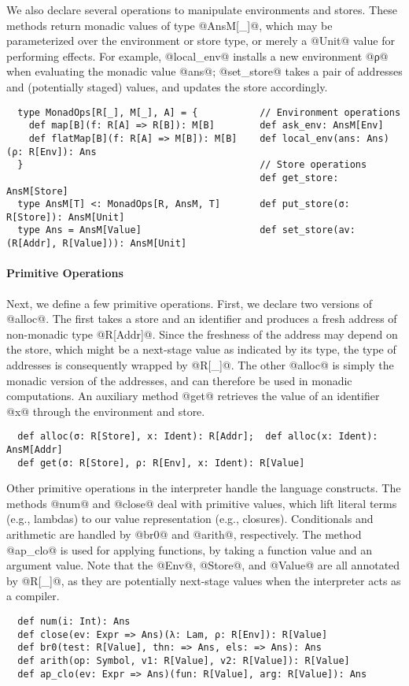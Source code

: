 We also declare several operations to manipulate environments and
stores. These methods return monadic values of type @AnsM[_]@, which
may be parameterized over the environment or store type, or merely a @Unit@
value for performing effects. For example, @local_env@ installs a new environment
@ρ@ when evaluating the monadic value @ans@; @set_store@ takes a pair of
addresses and (potentially staged) values, and updates the store accordingly.
\begin{lstlisting}
  type MonadOps[R[_], M[_], A] = {           // Environment operations
    def map[B](f: R[A] => R[B]): M[B]        def ask_env: AnsM[Env]
    def flatMap[B](f: R[A] => M[B]): M[B]    def local_env(ans: Ans)(ρ: R[Env]): Ans
  }                                          // Store operations
                                             def get_store: AnsM[Store]
  type AnsM[T] <: MonadOps[R, AnsM, T]       def put_store(σ: R[Store]): AnsM[Unit]
  type Ans = AnsM[Value]                     def set_store(av: (R[Addr], R[Value])): AnsM[Unit]
\end{lstlisting}

\paragraph{Primitive Operations} Next, we define a few primitive operations.
First, we declare two versions of @alloc@. The first takes a store and an
identifier and produces a fresh address of non-monadic type @R[Addr]@. Since
the freshness of the address may depend on the store, which might be a
next-stage value as indicated by its type, the type of addresses is
consequently wrapped by @R[_]@. The other @alloc@ is simply the monadic version
of the addresses, and can therefore be used in monadic computations.
An auxiliary method @get@ retrieves the value of an identifier @x@ through the
environment and store.
\begin{lstlisting}
  def alloc(σ: R[Store], x: Ident): R[Addr];  def alloc(x: Ident): AnsM[Addr]
  def get(σ: R[Store], ρ: R[Env], x: Ident): R[Value]
\end{lstlisting}

Other primitive operations in the interpreter handle the language constructs.  The
methods @num@ and @close@ deal with primitive values, which lift literal terms
(e.g., lambdas) to our value representation (e.g., closures).
Conditionals and arithmetic are handled by @br0@ and @arith@, respectively. The
method @ap_clo@ is used for applying functions, by taking a function value
and an argument value. Note that the @Env@, @Store@, and @Value@ are all
annotated by @R[_]@, as they are potentially next-stage values when the
interpreter acts as a compiler.
\begin{lstlisting}
  def num(i: Int): Ans
  def close(ev: Expr => Ans)(λ: Lam, ρ: R[Env]): R[Value]
  def br0(test: R[Value], thn: => Ans, els: => Ans): Ans
  def arith(op: Symbol, v1: R[Value], v2: R[Value]): R[Value]
  def ap_clo(ev: Expr => Ans)(fun: R[Value], arg: R[Value]): Ans
\end{lstlisting}

